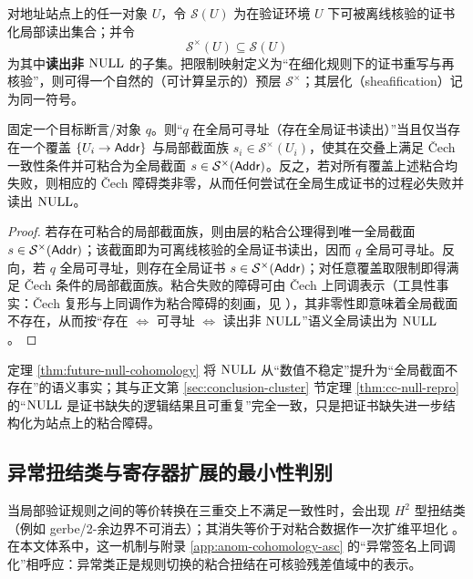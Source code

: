 \begin{definition}[非空值证书层]\label{def:future-sheaf}
对地址站点上的任一对象 $U$，令 $\mathcal{S}(U)$ 为在验证环境 $U$ 下可被离线核验的证书化局部读出集合；并令
$$
\mathcal{S}^\times(U)\subseteq \mathcal{S}(U)
$$
为其中\textbf{读出非 $\mathrm{NULL}$} 的子集。把限制映射定义为“在细化规则下的证书重写与再核验”，则可得一个自然的（可计算呈示的）预层 $\mathcal{S}^\times$；其层化（sheafification）记为同一符号。
\end{definition}

\begin{theorem}\label{thm:future-null-cohomology}
固定一个目标断言/对象 $q$。则“$q$ 在全局可寻址（存在全局证书读出）”当且仅当存在一个覆盖 $\{U_i\to \mathsf{Addr}\}$ 与局部截面族 $s_i\in\mathcal{S}^\times(U_i)$，使其在交叠上满足 Čech 一致性条件并可粘合为全局截面 $s\in\mathcal{S}^\times(\mathsf{Addr})$。反之，若对所有覆盖上述粘合均失败，则相应的 Čech 障碍类非零，从而任何尝试在全局生成证书的过程必失败并读出 $\mathrm{NULL}$。
\end{theorem}

\begin{proof}
若存在可粘合的局部截面族，则由层的粘合公理得到唯一全局截面 $s\in\mathcal{S}^\times(\mathsf{Addr})$；该截面即为可离线核验的全局证书读出，因而 $q$ 全局可寻址。反向，若 $q$ 全局可寻址，则存在全局证书 $s\in\mathcal{S}^\times(\mathsf{Addr})$；对任意覆盖取限制即得满足 Čech 条件的局部截面族。粘合失败的障碍可由 Čech 上同调表示（工具性事实：Čech 复形与上同调作为粘合障碍的刻画，见 \cite{StacksProject2026CohomologySites}），其非零性即意味着全局截面不存在，从而按“存在 $\Leftrightarrow$ 可寻址 $\Leftrightarrow$ 读出非 $\mathrm{NULL}$”语义全局读出为 $\mathrm{NULL}$。
\end{proof}

\begin{remark}
定理 \ref{thm:future-null-cohomology} 将 $\mathrm{NULL}$ 从“数值不稳定”提升为“全局截面不存在”的语义事实；其与正文第 \ref{sec:conclusion-cluster} 节定理 \ref{thm:cc-null-repro} 的“$\mathrm{NULL}$ 是证书缺失的逻辑结果且可重复”完全一致，只是把证书缺失进一步结构化为站点上的粘合障碍。
\end{remark}

\subsection{异常扭结类与寄存器扩展的最小性判别}\label{subsubsec:future-min-extension}
当局部验证规则之间的等价转换在三重交上不满足一致性时，会出现 $H^2$ 型扭结类（例如 gerbe/2-余边界不可消去）；其消失等价于对粘合数据作一次扩维平坦化 \cite{StacksProject2026CohomologySites}。在本文体系中，这一机制与附录 \ref{app:anom-cohomology-asc} 的“异常签名上同调化”相呼应：异常类正是规则切换的粘合扭结在可核验残差值域中的表示。

